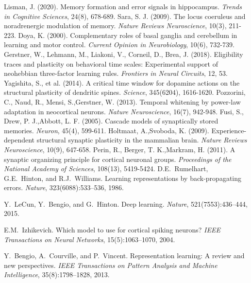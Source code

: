 \documentclass[11pt]{article}
\begin{document}

\begin{thebibliography}{99}
 Lisman, J. (2020). Memory formation and error signals in hippocampus. \emph{Trends in Cognitive Sciences}, 24(8), 678-689.
 Sara, S. J. (2009). The locus coeruleus and noradrenergic modulation of memory. \emph{Nature Reviews Neuroscience}, 10(3), 211-223.
 Doya, K. (2000). Complementary roles of basal ganglia and cerebellum in learning and motor control. \emph{Current Opinion in Neurobiology}, 10(6), 732-739.
 Gerstner, W., Lehmann, M., Liakoni, V., Corneil, D., Brea, J. (2018). Eligibility traces and plasticity on behavioral time scales: Experimental support of neohebbian three-factor learning rules. \emph{Frontiers in Neural Circuits}, 12, 53.
 Yagishita, S., et al. (2014). A critical time window for dopamine actions on the structural plasticity of dendritic spines. \emph{Science}, 345(6204), 1616-1620.
 Pozzorini, C., Naud, R., Mensi, S.,Gerstner, W. (2013). Temporal whitening by power-law adaptation in neocortical neurons. \emph{Nature Neuroscience}, 16(7), 942-948.
 Fusi, S., Drew, P. J.,Abbott, L. F. (2005). Cascade models of synaptically stored memories. \emph{Neuron}, 45(4), 599-611.
 Holtmaat, A.,Svoboda, K. (2009). Experience-dependent structural synaptic plasticity in the mammalian brain. \emph{Nature Reviews Neuroscience}, 10(9), 647-658.
 Perin, R., Berger, T. K.,Markram, H. (2011). A synaptic organizing principle for cortical neuronal groups. \emph{Proceedings of the National Academy of Sciences}, 108(13), 5419-5424.
D.E.~Rumelhart, G.E.~Hinton, and R.J.~Williams.
\newblock Learning representations by back-propagating errors.
\newblock \emph{Nature}, 323(6088):533--536, 1986.

Y.~LeCun, Y.~Bengio, and G.~Hinton.
\newblock Deep learning.
\newblock \emph{Nature}, 521(7553):436--444, 2015.

E.M.~Izhikevich.
\newblock Which model to use for cortical spiking neurons?
\newblock \emph{IEEE Transactions on Neural Networks}, 15(5):1063--1070, 2004.

Y.~Bengio, A.~Courville, and P.~Vincent.
\newblock Representation learning: A review and new perspectives.
\newblock \emph{IEEE Transactions on Pattern Analysis and Machine Intelligence}, 35(8):1798--1828, 2013.


\end{thebibliography}
\end{document}
